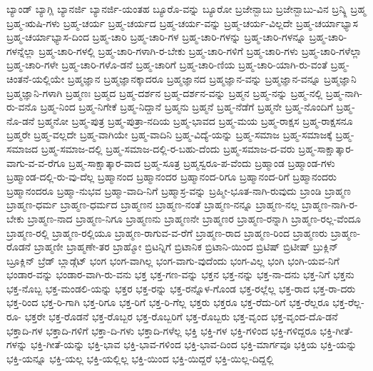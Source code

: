 {ಬ್ಯಾಂಡ್
ಬ್ಯಾಗ್ಲಿ
ಬ್ಯಾನರ್ಜಿ
ಬ್ಯಾನರ್ಜಿ-ಯಂತಹ
ಬ್ಯೂರೊ-ವನ್ನು
ಬ್ಯೂರೋ
ಬ್ರಜೇನ್ಬಾಬು
ಬ್ರಜೇನ್ಬಾಬು-ವಿನ
ಬ್ರನ್ಕ್ಲಿ
ಬ್ರಹ್ಮ
ಬ್ರಹ್ಮ-ಋಷಿ-ಗಳು
ಬ್ರಹ್ಮ-ಚರ್ಯ
ಬ್ರಹ್ಮ-ಚರ್ಯದ
ಬ್ರಹ್ಮ-ಚರ್ಯ-ವನ್ನು
ಬ್ರಹ್ಮ-ಚರ್ಯ-ವಿಲ್ಲದೇ
ಬ್ರಹ್ಮ-ಚರ್ಯಾಭ್ಯಾಸ
ಬ್ರಹ್ಮ-ಚರ್ಯಾಭ್ಯಾಸ-ದಿಂದ
ಬ್ರಹ್ಮ-ಚಾರಿ
ಬ್ರಹ್ಮ-ಚಾರಿ-ಗಳ
ಬ್ರಹ್ಮ-ಚಾರಿ-ಗಳನ್ನು
ಬ್ರಹ್ಮ-ಚಾರಿ-ಗಳನ್ನೂ
ಬ್ರಹ್ಮ-ಚಾರಿ-ಗಳನ್ನೆಲ್ಲಾ
ಬ್ರಹ್ಮ-ಚಾರಿ-ಗಳಲ್ಲಿ
ಬ್ರಹ್ಮ-ಚಾರಿ-ಗಳಾಗಿ-ರ-ಬೇಕು
ಬ್ರಹ್ಮ-ಚಾರಿ-ಗಳಿಗೆ
ಬ್ರಹ್ಮ-ಚಾರಿ-ಗಳು
ಬ್ರಹ್ಮ-ಚಾರಿ-ಗಳೆಲ್ಲಾ
ಬ್ರಹ್ಮ-ಚಾರಿ-ಗಳೇ
ಬ್ರಹ್ಮ-ಚಾರಿ-ಗಳೊ-ಡನೆ
ಬ್ರಹ್ಮ-ಚಾರಿಗೆ
ಬ್ರಹ್ಮ-ಚಾರಿ-ಣಿಯ
ಬ್ರಹ್ಮ-ಚಾರಿ-ಯಾಗಿ-ರು-ವಂತೆ
ಬ್ರಹ್ಮ-ಚಿಂತನೆ-ಯಲ್ಲಿಯೇ
ಬ್ರಹ್ಮಜ್ಞಾನ
ಬ್ರಹ್ಮಜ್ಞಾನಕ್ಕಾದರೂ
ಬ್ರಹ್ಮಜ್ಞಾನದ
ಬ್ರಹ್ಮಜ್ಞಾನ-ವನ್ನು
ಬ್ರಹ್ಮಜ್ಞಾನ-ವನ್ನೂ
ಬ್ರಹ್ಮಜ್ಞಾನಿ
ಬ್ರಹ್ಮಜ್ಞಾನಿ-ಗಳಾಗಿ
ಬ್ರಹ್ಮಣಃ
ಬ್ರಹ್ಮದ
ಬ್ರಹ್ಮ-ದರ್ಶನ
ಬ್ರಹ್ಮ-ದರ್ಶನ-ವನ್ನು
ಬ್ರಹ್ಮನ
ಬ್ರಹ್ಮ-ನನ್ನು
ಬ್ರಹ್ಮ-ನಲ್ಲಿ
ಬ್ರಹ್ಮ-ನಾಗಿ-ರು-ವನೊ
ಬ್ರಹ್ಮ-ನಿಂದ
ಬ್ರಹ್ಮ-ನಿಗೇಕೆ
ಬ್ರಹ್ಮ-ನಿದ್ದಾನೆ
ಬ್ರಹ್ಮನು
ಬ್ರಹ್ಮನೆ
ಬ್ರಹ್ಮ-ನೆಡೆಗೆ
ಬ್ರಹ್ಮನೇ
ಬ್ರಹ್ಮ-ನೊಂದಿಗೆ
ಬ್ರಹ್ಮ-ನೊ-ಡನೆ
ಬ್ರಹ್ಮನೋ
ಬ್ರಹ್ಮ-ಪುತ್ರ
ಬ್ರಹ್ಮ-ಪುತ್ರಾ-ನದಿಯ
ಬ್ರಹ್ಮ-ಭಾವದ
ಬ್ರಹ್ಮ-ಮಯ
ಬ್ರಹ್ಮ-ರಾಕ್ಷಸ
ಬ್ರಹ್ಮ-ರಾಕ್ಷಸನೂ
ಬ್ರಹ್ಮರೇ
ಬ್ರಹ್ಮ-ವಲ್ಲದೇ
ಬ್ರಹ್ಮ-ವಾಗಿಯೇ
ಬ್ರಹ್ಮ-ವಾದಿನಿ
ಬ್ರಹ್ಮ-ವಿದ್ಯೆ-ಯನ್ನು
ಬ್ರಹ್ಮ-ಸಮಾಜ
ಬ್ರಹ್ಮ-ಸಮಾಜಕ್ಕೆ
ಬ್ರಹ್ಮ-ಸಮಾಜದ
ಬ್ರಹ್ಮ-ಸಮಾಜ-ದಲ್ಲಿ
ಬ್ರಹ್ಮ-ಸಮಾಜ-ದಲ್ಲಿ-ರ-ಬಹು-ದೆಂದು
ಬ್ರಹ್ಮ-ಸಮಾಜ-ದ-ವರು
ಬ್ರಹ್ಮ-ಸಾಕ್ಷಾತ್ಕಾರ-ವಾಗು-ವ-ವ-ರೆಗೂ
ಬ್ರಹ್ಮ-ಸಾಕ್ಷಾತ್ಕಾರ-ವಾದ
ಬ್ರಹ್ಮ-ಸೂತ್ರ
ಬ್ರಹ್ಮಸ್ವರೂ-ಪ-ವೆಂದು
ಬ್ರಹ್ಮಾಂಡ
ಬ್ರಹ್ಮಾಂಡ-ಗಳು
ಬ್ರಹ್ಮಾಂಡ-ದಲ್ಲಿ-ರು-ವು-ದೆಲ್ಲ
ಬ್ರಹ್ಮಾನಂದ
ಬ್ರಹ್ಮಾನಂದರ
ಬ್ರಹ್ಮಾನಂದ-ರಿಗೂ
ಬ್ರಹ್ಮಾನಂದ-ರಿಗೆ
ಬ್ರಹ್ಮಾನಂದರು
ಬ್ರಹ್ಮಾನಂದರೂ
ಬ್ರಹ್ಮಾ-ನುಭವ
ಬ್ರಹ್ಮಾ-ವಾದಿ-ನಿಗೆ
ಬ್ರಹ್ಮಾಸ್ರ-ವನ್ನು
ಬ್ರಹ್ಮೀ-ಭೂತ-ನಾಗಿ-ರುವುದು
ಬ್ರಾಂಡಿ
ಬ್ರಾಹ್ಮಣ
ಬ್ರಾಹ್ಮಣ-ಧರ್ಮ
ಬ್ರಾಹ್ಮಣ-ಧರ್ಮದ
ಬ್ರಾಹ್ಮಣನ
ಬ್ರಾಹ್ಮಣ-ನಂತೆ
ಬ್ರಾಹ್ಮಣ-ನನ್ನೂ
ಬ್ರಾಹ್ಮಣ-ನಲ್ಲ
ಬ್ರಾಹ್ಮಣ-ನಾಗಿ-ರ-ಬೇಕು
ಬ್ರಾಹ್ಮಣ-ನಾದ
ಬ್ರಾಹ್ಮಣ-ನಿಗೂ
ಬ್ರಾಹ್ಮಣನು
ಬ್ರಾಹ್ಮಣನೇ
ಬ್ರಾಹ್ಮಣರ
ಬ್ರಾಹ್ಮಣ-ರನ್ನಾಗಿ
ಬ್ರಾಹ್ಮಣ-ರಲ್ಲ-ವೆಂದೂ
ಬ್ರಾಹ್ಮಣ-ರಲ್ಲಿ
ಬ್ರಾಹ್ಮಣ-ರಲ್ಲಿಯೂ
ಬ್ರಾಹ್ಮಣ-ರಾಗುವ-ವ-ರೆಗೆ
ಬ್ರಾಹ್ಮಣ-ರಾದ
ಬ್ರಾಹ್ಮಣ-ರಿಂದ
ಬ್ರಾಹ್ಮಣರು
ಬ್ರಾಹ್ಮಣ-ರೊಡನೆ
ಬ್ರಾಹ್ಮಣೀ
ಬ್ರಾಹ್ಮಣೇ-ತರ
ಬ್ರಾಹ್ಮೋ
ಬ್ರಿಟನ್ನಿಗೆ
ಬ್ರಿಟಾನಿಕ
ಬ್ರಿಟಾನಿ-ಯಿಂದ
ಬ್ರಿಟಿಷ್
ಬ್ರಿಟೀಷ್
ಬ್ರುಕ್ಲಿನ್
ಬ್ರೂಕ್ಲಿನ್
ಬ್ರೆಡ್
ಬ್ಲಾಡ್ಗೆಟ್
ಭಂಗ
ಭಂಗ-ವಾಗಿಲ್ಲ
ಭಂಗ-ವಾಗು-ವುದೆಂದು
ಭಂಗ-ವಿಲ್ಲ
ಭಂಗಿ
ಭಂಗಿ-ಯವ-ನಿಗೆ
ಭಂಡಾರ-ವನ್ನು
ಭಂಡಾರ-ವಾಗಿ-ರು-ವನು
ಭಕ್ತ
ಭಕ್ತ-ಗಣ-ವನ್ನು
ಭಕ್ತನ
ಭಕ್ತ-ನನ್ನು
ಭಕ್ತ-ನಾ-ದನು
ಭಕ್ತ-ನಿಗೆ
ಭಕ್ತನು
ಭಕ್ತ-ನೊಬ್ಬ
ಭಕ್ತ-ಮಂಡಲಿ-ಯನ್ನು
ಭಕ್ತರ
ಭಕ್ತ-ರನ್ನು
ಭಕ್ತ-ರನ್ನೊಳ-ಗೊಂಡ
ಭಕ್ತ-ರಲ್ಲೆಲ್ಲ
ಭಕ್ತ-ರಾದ
ಭಕ್ತ-ರಾ-ದರು
ಭಕ್ತ-ರಿಂದ
ಭಕ್ತ-ರಿ-ಗಾಗಿ
ಭಕ್ತ-ರಿಗೂ
ಭಕ್ತ-ರಿಗೆ
ಭಕ್ತ-ರಿ-ಗೆಲ್ಲ
ಭಕ್ತರು
ಭಕ್ತರೂ
ಭಕ್ತ-ರೆದು-ರಿಗೆ
ಭಕ್ತ-ರೆಲ್ಲರೂ
ಭಕ್ತ-ರೆಲ್ಲ-ರೂ-
ಭಕ್ತರೇ
ಭಕ್ತ-ರೊಡನೆ
ಭಕ್ತ-ರೊಬ್ಬರ
ಭಕ್ತ-ರೊಬ್ಬರಿಗೆ
ಭಕ್ತ-ರೊಬ್ಬರು
ಭಕ್ತ-ವೃಂದ
ಭಕ್ತ-ವೃಂದ-ದೊ-ಡನೆ
ಭಕ್ತಾದಿ-ಗಳ
ಭಕ್ತಾದಿ-ಗಳಿಗೆ
ಭಕ್ತಾ-ದಿ-ಗಳು
ಭಕ್ತಾದಿ-ಗಳೆಲ್ಲ
ಭಕ್ತಿ
ಭಕ್ತಿ-ಗಳ
ಭಕ್ತಿ-ಗಳಿಂದ
ಭಕ್ತಿ-ಗಳಿದ್ದರೂ
ಭಕ್ತಿ-ಗೀತೆ-ಗಳನ್ನು
ಭಕ್ತಿ-ಗೀತೆ-ಯನ್ನು
ಭಕ್ತಿ-ಭಾವ
ಭಕ್ತಿ-ಭಾವ-ಗಳಿಂದ
ಭಕ್ತಿ-ಭಾವ-ದಿಂದ
ಭಕ್ತಿ-ಮಾರ್ಗವೂ
ಭಕ್ತಿಯ
ಭಕ್ತಿ-ಯನ್ನು
ಭಕ್ತಿ-ಯನ್ನೂ
ಭಕ್ತಿ-ಯಲ್ಲ
ಭಕ್ತಿ-ಯಲ್ಲಿಲ್ಲ
ಭಕ್ತಿ-ಯಿಂದ
ಭಕ್ತಿ-ಯಿದ್ದರೆ
ಭಕ್ತಿ-ಯಿಲ್ಲ-ದಿದ್ದಲ್ಲಿ
}
